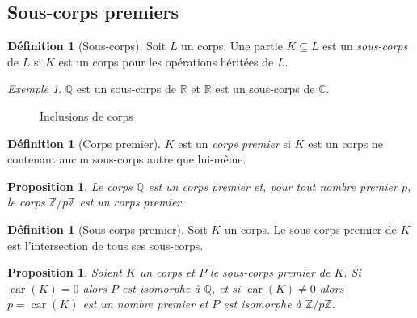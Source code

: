 \documentclass[a4paper, titlepage]{article}
\newtheorem{prop}[theo]{Proposition}
\theoremstyle{definition}
\newtheorem{defi}[theo]{Définition}
\theoremstyle{remark}
\newtheorem{exem}[theo]{Exemple}
\def\Z{\mathbb Z}
\def\Q{\mathbb Q}
\def\R{\mathbb R}
\def\C{\mathbb C}
\def\car{\operatorname{car}}
\begin{document}
\subsection{Sous-corps premiers}

\begin{defi}[Sous-corps]
Soit $L$ un corps. Une partie $K \subseteq L$ est un \textit{sous-corps} de $L$ si $K$ est un corps pour les opérations héritées de $L$.
\end{defi}

\begin{exem}
$\Q$ est un sous-corps de $\R$ et $\R$ est un sous-corps de $\C$.
\end{exem}

\begin{figure}[h]
\begin{center}
\caption{Inclusions de corps}
\end{center}
\end{figure}

\begin{defi}[Corps premier]
$K$ est un \textit{corps premier} si $K$ est un corps ne contenant aucun sous-corps autre que lui-même.
\end{defi}

\begin{prop}
Le corps $\Q$ est un corps premier et, pour tout nombre premier $p$, le corps $\Z/p\Z$ est un corps premier.
\end{prop}

\begin{defi}[Sous-corps premier]
Soit $K$ un corps. Le sous-corps premier de $K$ est l'intersection de tous ses sous-corps.
\end{defi}

\begin{prop}
Soient $K$ un corps et $P$ le sous-corps premier de $K$. Si $\car(K) = 0$ alors $P$ est isomorphe à $\Q$, et si $\car(K) \neq 0$ alors $p = \car(K)$ est un nombre premier et $P$ est isomorphe à $\Z/p\Z$.
\end{prop}
\end{document}
